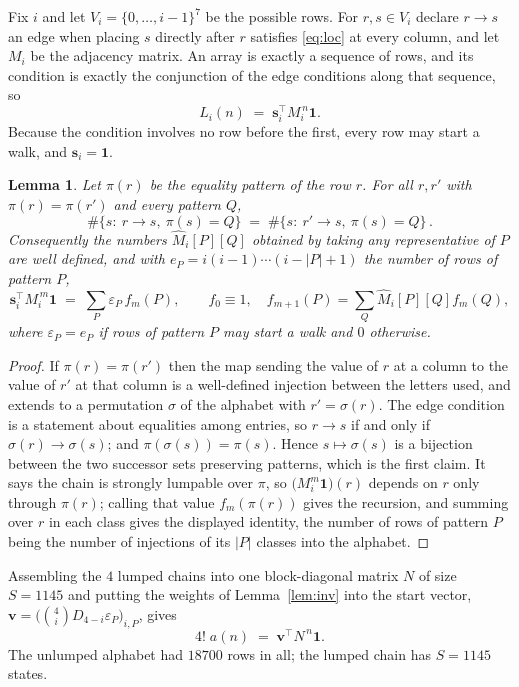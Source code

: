 \documentclass[11pt,a4paper]{article}
\theoremstyle{plain}
\newtheorem{lemma}[theorem]{Lemma}
\theoremstyle{definition}
\begin{document}
Fix $i$ and let $V_i=\{0,\dots,i-1\}^{7}$ be the possible rows. For $r,s\in V_i$
declare $r\to s$ an edge when placing $s$ directly after $r$ satisfies \eqref{eq:loc} at
every column, and let $M_i$ be the adjacency matrix. An array is exactly a sequence of
rows, and its condition is exactly the conjunction of the edge conditions along that
sequence, so
\[
L_i(n)\;=\;\mathbf{s}_i^{\!\top}M_i^{\,n}\mathbf{1} .
\]
Because the condition involves no row before the first, every
row may start a walk, and $\mathbf{s}_i=\mathbf{1}$.

\begin{lemma}\label{lem:lump}
Let $\pi(r)$ be the equality pattern of the row $r$. For all $r,r'$ with
$\pi(r)=\pi(r')$ and every pattern $Q$,
\[
\#\{s:\ r\to s,\ \pi(s)=Q\}\;=\;\#\{s:\ r'\to s,\ \pi(s)=Q\}\, .
\]
Consequently the numbers $\widehat M_i[P][Q]$ obtained by taking any representative of $P$
are well defined, and with $e_P=i(i-1)\cdots(i-|P|+1)$ the number of rows of pattern $P$,
\[
\mathbf{s}_i^{\!\top}M_i^{\,m}\mathbf{1}\;=\;\sum_P \varepsilon_P\,f_m(P),
\qquad f_0\equiv1,\quad f_{m+1}(P)=\sum_Q\widehat M_i[P][Q]f_m(Q),
\]
where $\varepsilon_P=e_P$ if rows of pattern $P$ may start a walk and $0$ otherwise.
\end{lemma}

\begin{proof}
If $\pi(r)=\pi(r')$ then the map sending the value of $r$ at a column to the value of $r'$
at that column is a well-defined injection between the letters used, and extends to a
permutation $\sigma$ of the alphabet with $r'=\sigma(r)$. The edge condition is a statement
about equalities among entries, so $r\to s$ if and only if $\sigma(r)\to\sigma(s)$; and
$\pi(\sigma(s))=\pi(s)$. Hence $s\mapsto\sigma(s)$ is a bijection between the two successor
sets preserving patterns, which is the first claim. It says the chain is strongly lumpable
over $\pi$, so $\bigl(M_i^{m}\mathbf{1}\bigr)(r)$ depends on $r$ only through $\pi(r)$;
calling that value $f_m(\pi(r))$ gives the recursion, and summing over $r$ in each class
gives the displayed identity, the number of rows of pattern $P$ being the number of
injections of its $|P|$ classes into the alphabet.
\end{proof}

Assembling the $4$ lumped chains into one block-diagonal matrix $N$ of size $S=1145$ and
putting the weights of Lemma~\ref{lem:inv} into the start vector,
$\mathbf{v}=\bigl(\binom{4}{i}D_{4-i}\varepsilon_P\bigr)_{i,P}$, gives
\begin{equation}\label{eq:walk}
4!\;a(n)\;=\;\mathbf{v}^{\!\top}N^{\,n}\mathbf{1} .
\end{equation}
The unlumped alphabet had $18700$ rows in all; the lumped chain has $S=1145$ states.
\end{document}

